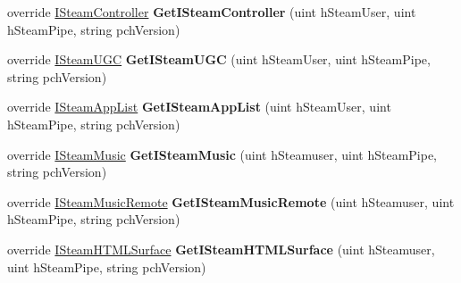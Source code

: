 \begin{DoxyCompactItemize}
\item 
\hypertarget{classValve_1_1Steamworks_1_1CSteamClient_a45c06dec75c161d6f09a5a206787a9f7}{}override \hyperlink{classValve_1_1Steamworks_1_1ISteamController}{I\+Steam\+Controller} {\bfseries Get\+I\+Steam\+Controller} (uint h\+Steam\+User, uint h\+Steam\+Pipe, string pch\+Version)\label{classValve_1_1Steamworks_1_1CSteamClient_a45c06dec75c161d6f09a5a206787a9f7}

\item 
\hypertarget{classValve_1_1Steamworks_1_1CSteamClient_a4ea3f0ce63c8c375d919caafeeb63c77}{}override \hyperlink{classValve_1_1Steamworks_1_1ISteamUGC}{I\+Steam\+U\+G\+C} {\bfseries Get\+I\+Steam\+U\+G\+C} (uint h\+Steam\+User, uint h\+Steam\+Pipe, string pch\+Version)\label{classValve_1_1Steamworks_1_1CSteamClient_a4ea3f0ce63c8c375d919caafeeb63c77}

\item 
\hypertarget{classValve_1_1Steamworks_1_1CSteamClient_aa440d1d2ea3f712ca0787a73536f7421}{}override \hyperlink{classValve_1_1Steamworks_1_1ISteamAppList}{I\+Steam\+App\+List} {\bfseries Get\+I\+Steam\+App\+List} (uint h\+Steam\+User, uint h\+Steam\+Pipe, string pch\+Version)\label{classValve_1_1Steamworks_1_1CSteamClient_aa440d1d2ea3f712ca0787a73536f7421}

\item 
\hypertarget{classValve_1_1Steamworks_1_1CSteamClient_af7d66275d8f973ec2aebb112d3914435}{}override \hyperlink{classValve_1_1Steamworks_1_1ISteamMusic}{I\+Steam\+Music} {\bfseries Get\+I\+Steam\+Music} (uint h\+Steamuser, uint h\+Steam\+Pipe, string pch\+Version)\label{classValve_1_1Steamworks_1_1CSteamClient_af7d66275d8f973ec2aebb112d3914435}

\item 
\hypertarget{classValve_1_1Steamworks_1_1CSteamClient_aafb9b697e448c49aaf1008c51d5a3842}{}override \hyperlink{classValve_1_1Steamworks_1_1ISteamMusicRemote}{I\+Steam\+Music\+Remote} {\bfseries Get\+I\+Steam\+Music\+Remote} (uint h\+Steamuser, uint h\+Steam\+Pipe, string pch\+Version)\label{classValve_1_1Steamworks_1_1CSteamClient_aafb9b697e448c49aaf1008c51d5a3842}

\item 
\hypertarget{classValve_1_1Steamworks_1_1CSteamClient_a4e630c23a15cc3d2f6e9b8e962915d44}{}override \hyperlink{classValve_1_1Steamworks_1_1ISteamHTMLSurface}{I\+Steam\+H\+T\+M\+L\+Surface} {\bfseries Get\+I\+Steam\+H\+T\+M\+L\+Surface} (uint h\+Steamuser, uint h\+Steam\+Pipe, string pch\+Version)\label{classValve_1_1Steamworks_1_1CSteamClient_a4e630c23a15cc3d2f6e9b8e962915d44}


\end{DoxyCompactItemize}
